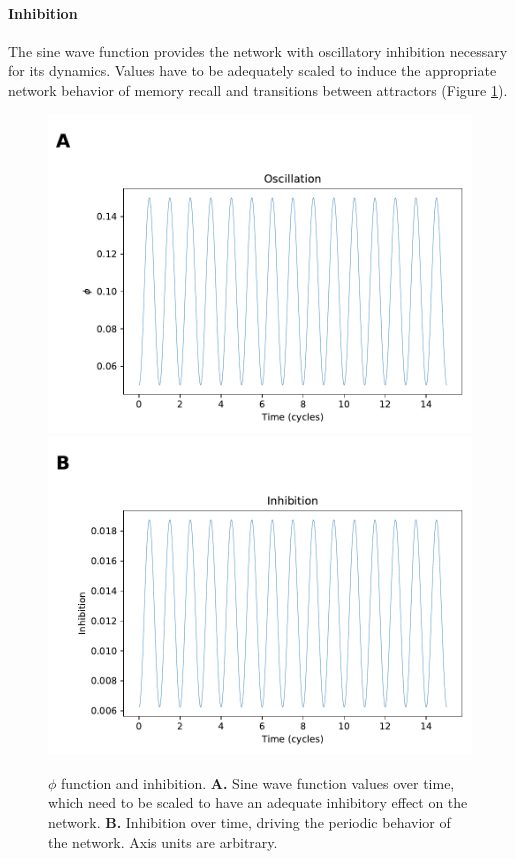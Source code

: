     \paragraph{Inhibition}

    The sine wave function provides the network with oscillatory inhibition necessary for its dynamics.
    Values have to be adequately scaled to induce the appropriate network behavior of memory recall and transitions between attractors (Figure \ref{fig:inhibition}).

    \begin{figure}
        \includegraphics[width=\textwidth]{graphics/oscillation.pdf}
        \includegraphics[width=\textwidth]{graphics/inhibition.pdf}
        \caption{
        \(\phi\) function and inhibition.
        \textbf{A.} Sine wave function values over time, which need to be scaled to have an adequate inhibitory effect on the network.
        \textbf{B.} Inhibition over time, driving the periodic behavior of the network.
        Axis units are arbitrary.
        }
        \label{fig:inhibition}
    \end{figure}
